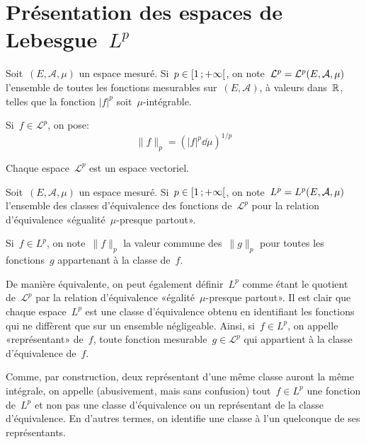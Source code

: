 \medskip
\section{Présentation des espaces de Lebesgue~$L^p$}

\begin{definition}
Soit~$(E,\mathcal{A},\mu)$ un espace mesuré.
Si~$\colorred p\in\intfo{1}{+\infty}$, on note~$\colorblue \mathcal{L}^p=\mathcal{L}^p(E,\mathcal{A},\mu)$ l'ensemble de toutes
les fonctions mesurables sur~$(E,\mathcal{A})$, à valeurs dans~$\mathbb R$, telles que la fonction
$|f|^p$ soit~$\mu$-intégrable.

Si~$f\in\mathcal{L}^p$, on pose:
\begin{equation}\|f\|_p=\left(|f|^p\dd\mu\right)^{1/p} \end{equation}
\end{definition}

\begin{theoreme}
Chaque espace~$\mathcal{L}^p$ est un espace vectoriel.
\end{theoreme}

\begin{definition}[Espace~$L^p$]
Soit~$(E,\mathcal{A},\mu)$ un espace mesuré.
Si~$\colorred p\in\intfo{1}{+\infty}$, on note~$\colorblue L^p=L^p(E,\mathcal{A},\mu)$ l'ensemble des
classes d'équivalence des fonctions de~$\mathcal{L}^p$ pour la relation d'équivalence
«égualité~$\mu$-presque partout».

Si~$f\in L^p$, on note~$\|f\|_p$ la valeur commune des~$\| g\| _p$ pour toutes les fonctions~$g$
appartenant à la classe de~$f$.
\end{definition}

De manière équivalente, on peut également définir~$L^p$ comme étant le quotient de~$\mathcal{L}^p$ par la relation d'équivalence «égalité~$\mu$-presque partout».
\medskipvm
Il est clair que chaque espace~$L^p$ est une classe d'équivalence obtenu en identifiant les fonctions qui ne diffèrent que sur un ensemble négligeable. Ainsi, si~$f\in L^p$, on appelle «représentant» de~$f$, toute fonction mesurable~$g\in\mathcal{L}^p$ qui appartient à la classe d'équivalence de~$f$.

Comme, par construction, deux représentant d'une même classe auront la même intégrale, on
appelle (abusivement, mais sans confusion) tout~$f\in L^p$ une fonction de~$L^p$ et non pas une classe d'équivalence ou un représentant de la classe d'équivalence.
En d'autres termes, on identifie une classe à l'un quelconque de ses représentants.

